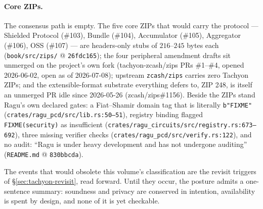 \documentclass[11pt,a4paper]{article}
\theoremstyle{definition}
\begin{document}
\paragraph{Core ZIPs.} The consensus path is empty. The five core ZIPs that
would carry the protocol --- Shielded Protocol (\#103), Bundle (\#104),
Accumulator (\#105), Aggregator (\#106), OSS (\#107) --- are headers-only
stubs of $216$--$245$ bytes each (\texttt{book/src/zips/} @
\texttt{26fdc165}); the four peripheral amendment drafts sit unmerged on
the project's own fork (tachyon-zcash/zips PRs \#1--\#4, opened 2026-06-02,
open as of 2026-07-08); upstream \texttt{zcash/zips} carries zero Tachyon
ZIPs; and the extensible-format substrate everything defers to, ZIP 248,
is itself an unmerged PR idle since 2026-05-26 (zcash/zips\#1156). Beside
the ZIPs stand Ragu's own declared gates: a Fiat--Shamir domain tag that is
literally \texttt{b"FIXME"} (\texttt{crates/ragu\_pcd/src/lib.rs:50--51}),
registry binding flagged \texttt{FIXME(security)} as insufficient
(\texttt{crates/ragu\_circuits/src/registry.rs:673--692}), three missing
verifier checks (\texttt{crates/ragu\_pcd/src/verify.rs:122}), and no
audit: ``Ragu is under heavy development and has not undergone auditing''
(\texttt{README.md} @ \texttt{830bbcda}).

The events that would obsolete this volume's classification are the revisit
triggers of \S\ref{sec:tachyon-revisit}, read forward. Until they occur, the
posture admits a one-sentence summary:
soundness and privacy are conserved in intention, availability is spent by
design, and none of it is yet checkable.
\end{document}
